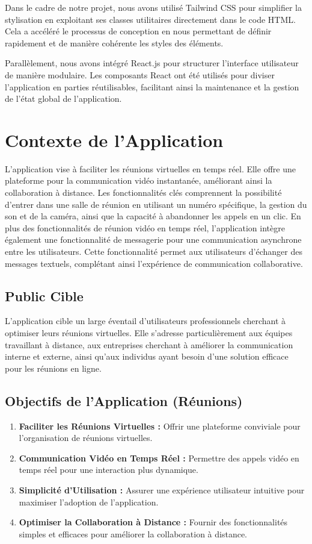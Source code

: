 \documentclass[12pt, a4paper, oneside]{thesis}
\begin{document}
Dans le cadre de notre projet, nous avons utilisé Tailwind CSS pour simplifier la stylisation en exploitant ses classes utilitaires directement dans le code HTML. Cela a accéléré le processus de conception en nous permettant de définir rapidement et de manière cohérente les styles des éléments.

Parallèlement, nous avons intégré React.js pour structurer l'interface utilisateur de manière modulaire. Les composants React ont été utilisés pour diviser l'application en parties réutilisables, facilitant ainsi la maintenance et la gestion de l'état global de l'application.

\section{Contexte de l'Application}
L'application vise à faciliter les réunions virtuelles en temps réel. Elle offre une plateforme pour la communication vidéo instantanée, améliorant ainsi la collaboration à distance. Les fonctionnalités clés comprennent la possibilité d'entrer dans une salle de réunion en utilisant un numéro spécifique, la gestion du son et de la caméra, ainsi que la capacité à abandonner les appels en un clic.
En plus des fonctionnalités de réunion vidéo en temps réel, l'application intègre également une fonctionnalité de messagerie pour une communication asynchrone entre les utilisateurs. Cette fonctionnalité permet aux utilisateurs d'échanger des messages textuels, complétant ainsi l'expérience de communication collaborative.

\subsection{Public Cible}
L'application cible un large éventail d'utilisateurs professionnels cherchant à optimiser leurs réunions virtuelles. Elle s'adresse particulièrement aux équipes travaillant à distance, aux entreprises cherchant à améliorer la communication interne et externe, ainsi qu'aux individus ayant besoin d'une solution efficace pour les réunions en ligne.

\subsection{Objectifs de l'Application (Réunions)}
\begin{enumerate}
    \item \textbf{Faciliter les Réunions Virtuelles :} Offrir une plateforme conviviale pour l'organisation de réunions virtuelles.
    \item \textbf{Communication Vidéo en Temps Réel :} Permettre des appels vidéo en temps réel pour une interaction plus dynamique.
    \item \textbf{Simplicité d'Utilisation :} Assurer une expérience utilisateur intuitive pour maximiser l'adoption de l'application.
    \item \textbf{Optimiser la Collaboration à Distance :} Fournir des fonctionnalités simples et efficaces pour améliorer la collaboration à distance.
\end{enumerate}
\end{document}
